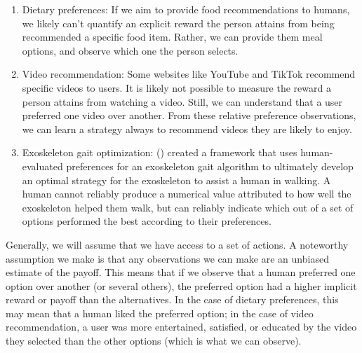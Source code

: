 \documentclass[
  letterpaper,
  DIV=11,
  numbers=noendperiod,
  oneside]{scrreprt}
\theoremstyle{remark}
\begin{document}
\begin{enumerate}
\def\labelenumi{\arabic{enumi}.}
\item
  Dietary preferences: If we aim to provide food recommendations to
  humans, we likely can't quantify an explicit reward the person attains
  from being recommended a specific food item. Rather, we can provide
  them meal options, and observe which one the person selects.
\item
  Video recommendation: Some websites like YouTube and TikTok recommend
  specific videos to users. It is likely not possible to measure the
  reward a person attains from watching a video. Still, we can
  understand that a user preferred one video over another. From these
  relative preference observations, we can learn a strategy always to
  recommend videos they are likely to enjoy.
\item
  Exoskeleton gait optimization:
  () created
  a framework that uses human-evaluated preferences for an exoskeleton
  gait algorithm to ultimately develop an optimal strategy for the
  exoskeleton to assist a human in walking. A human cannot reliably
  produce a numerical value attributed to how well the exoskeleton
  helped them walk, but can reliably indicate which out of a set of
  options performed the best according to their preferences.
\end{enumerate}

Generally, we will assume that we have access to a set of actions. A
noteworthy assumption we make is that any observations we can make are
an unbiased estimate of the payoff. This means that if we observe that a
human preferred one option over another (or several others), the
preferred option had a higher implicit reward or payoff than the
alternatives. In the case of dietary preferences, this may mean that a
human liked the preferred option; in the case of video recommendation, a
user was more entertained, satisfied, or educated by the video they
selected than the other options (which is what we can observe).
\end{document}
